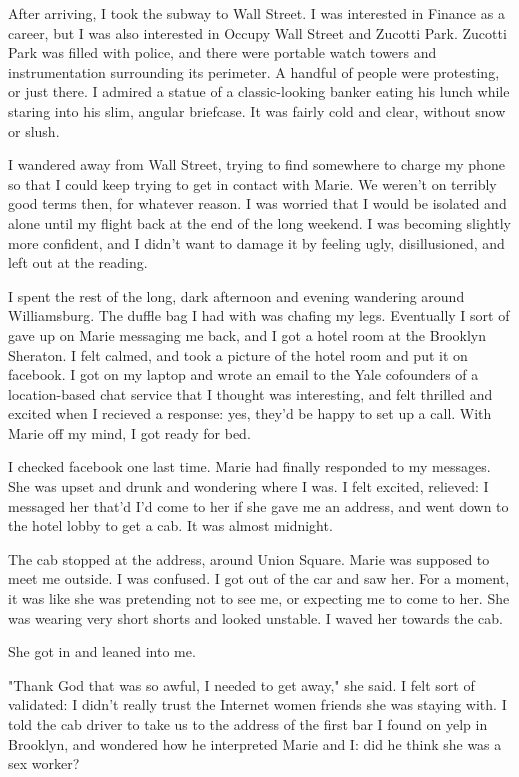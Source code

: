 \documentclass[12pt]{article}
\begin{document}
After arriving, I took the subway to Wall Street.  I was interested in Finance
as a career, but I was also interested in Occupy Wall Street and Zucotti Park.
Zucotti Park was filled with police, and there were portable watch towers and
instrumentation surrounding its perimeter.  A handful of people were protesting,
or just there.  I admired a statue of a classic-looking banker eating his lunch
while staring into his slim, angular briefcase.  It was fairly cold and clear,
without snow or slush.

I wandered away from Wall Street, trying to find somewhere to charge my phone so
that I could keep trying to get in contact with Marie.  We weren't on terribly
good terms then, for whatever reason.  I was worried that I would be isolated
and alone until my flight back at the end of the long weekend.  I was becoming
slightly more confident, and I didn't want to damage it by feeling ugly,
disillusioned, and left out at the reading.

I spent the rest of the long, dark afternoon and evening wandering around
Williamsburg.  The duffle bag I had with was chafing my legs.  Eventually I sort
of gave up on Marie messaging me back, and I got a hotel room at the Brooklyn
Sheraton.  I felt calmed, and took a picture of the hotel room and put it on
facebook.  I got on my laptop and wrote an email to the Yale cofounders of a
location-based chat service that I thought was interesting, and felt thrilled
and excited when I recieved a response: yes, they'd be happy to set up a call.
With Marie off my mind, I got ready for bed.  

I checked facebook one last time.  Marie had finally responded to my messages.
She was upset and drunk and wondering where I was.  I felt excited, relieved: I
messaged her that'd I'd come to her if she gave me an address, and went down to
the hotel lobby to get a cab.  It was almost midnight.

The cab stopped at the address, around Union Square.  Marie was supposed to meet
me outside. I was confused.  I got out of the car and saw her.  For a moment, it
was like she was pretending not to see me, or expecting me to come to her.  She
was wearing very short shorts and looked unstable.  I waved her towards the cab.  

She got in and leaned into me.

"Thank God that was so awful, I needed to get away," she said.  I felt sort of
validated: I didn't really trust the Internet women friends she was staying
with.  I told the cab driver to take us to the address of the first bar I found
on yelp in Brooklyn, and wondered how he interpreted Marie and I: did he think
she was a sex worker?  
\end{document}
